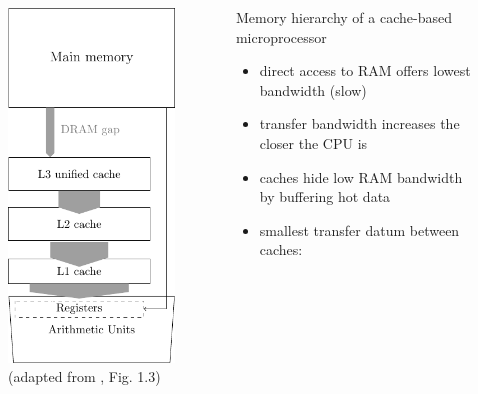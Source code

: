 \documentclass[9pt,xcolor=table]{beamer}
\begin{document}
\begin{frame}
\begin{columns}[c]
  \begin{column}{.45\textwidth}
    \begin{figure}[htb]
      \includegraphics[height=0.78\textheight]{tikz/dram_gap}\\[2pt]\footnotesize
      (adapted from \cite{HagerWelleinIntroHPC}, Fig. 1.3)
    \end{figure}
  \end{column}
  \begin{column}{.45\textwidth}
    \vfill
    \begin{block}{Memory hierarchy of a cache-based microprocessor}
      \begin{itemize}
      \item direct access to RAM offers lowest bandwidth (slow)
      \item transfer bandwidth increases the closer the CPU is
      \item caches hide low RAM bandwidth by buffering hot data
      \item smallest transfer datum between caches:

\end{itemize}
\end{block}
\end{column}
\end{columns}
\end{frame}
\end{document}
